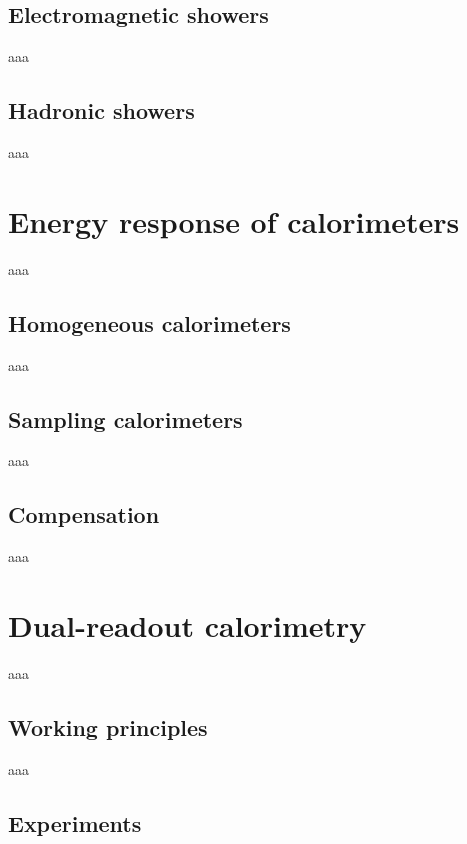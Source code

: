 \subsection{Electromagnetic showers}
aaa

\subsection{Hadronic showers}
aaa

\section{Energy response of calorimeters}
aaa

\subsection{Homogeneous calorimeters}
aaa

\subsection{Sampling calorimeters}
aaa

\subsection{Compensation}
aaa

\section{Dual-readout calorimetry}
aaa

\subsection{Working principles}
aaa

\subsection{Experiments}
